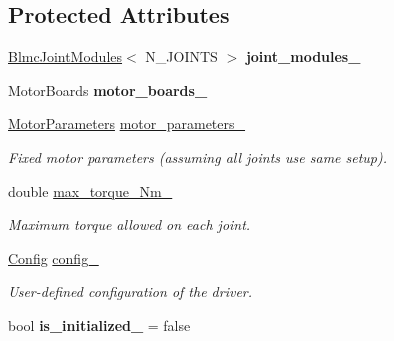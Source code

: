 \subsection*{Protected Attributes}
\begin{DoxyCompactItemize}
\item 
\hyperlink{classblmc__robots_1_1BlmcJointModules}{Blmc\+Joint\+Modules}$<$ N\+\_\+\+J\+O\+I\+N\+TS $>$ {\bfseries joint\+\_\+modules\+\_\+}\hypertarget{classblmc__robots_1_1NJointBlmcRobotDriver_a350c204742b25ae2808670b1b56099b8}{}\label{classblmc__robots_1_1NJointBlmcRobotDriver_a350c204742b25ae2808670b1b56099b8}

\item 
Motor\+Boards {\bfseries motor\+\_\+boards\+\_\+}\hypertarget{classblmc__robots_1_1NJointBlmcRobotDriver_a68e9cafdfc02da872dbc86c2fd162408}{}\label{classblmc__robots_1_1NJointBlmcRobotDriver_a68e9cafdfc02da872dbc86c2fd162408}

\item 
\hyperlink{structblmc__robots_1_1MotorParameters}{Motor\+Parameters} \hyperlink{classblmc__robots_1_1NJointBlmcRobotDriver_a035472dd47cf790d38b49d50fe51ba61}{motor\+\_\+parameters\+\_\+}\hypertarget{classblmc__robots_1_1NJointBlmcRobotDriver_a035472dd47cf790d38b49d50fe51ba61}{}\label{classblmc__robots_1_1NJointBlmcRobotDriver_a035472dd47cf790d38b49d50fe51ba61}

\begin{DoxyCompactList}\small\item\em Fixed motor parameters (assuming all joints use same setup). \end{DoxyCompactList}\item 
double \hyperlink{classblmc__robots_1_1NJointBlmcRobotDriver_a4c4b68c6ce49317b2bc15e20c136c2d5}{max\+\_\+torque\+\_\+\+Nm\+\_\+}\hypertarget{classblmc__robots_1_1NJointBlmcRobotDriver_a4c4b68c6ce49317b2bc15e20c136c2d5}{}\label{classblmc__robots_1_1NJointBlmcRobotDriver_a4c4b68c6ce49317b2bc15e20c136c2d5}

\begin{DoxyCompactList}\small\item\em Maximum torque allowed on each joint. \end{DoxyCompactList}\item 
\hyperlink{structblmc__robots_1_1NJointBlmcRobotDriver_1_1Config}{Config} \hyperlink{classblmc__robots_1_1NJointBlmcRobotDriver_a704ad05a652572289b74525e18680c11}{config\+\_\+}
\begin{DoxyCompactList}\small\item\em User-\/defined configuration of the driver. \end{DoxyCompactList}\item 
bool {\bfseries is\+\_\+initialized\+\_\+} = false\hypertarget{classblmc__robots_1_1NJointBlmcRobotDriver_abda748741eda4ad890d6e55b09b173d4}{}\label{classblmc__robots_1_1NJointBlmcRobotDriver_abda748741eda4ad890d6e55b09b173d4}

\end{DoxyCompactItemize}


